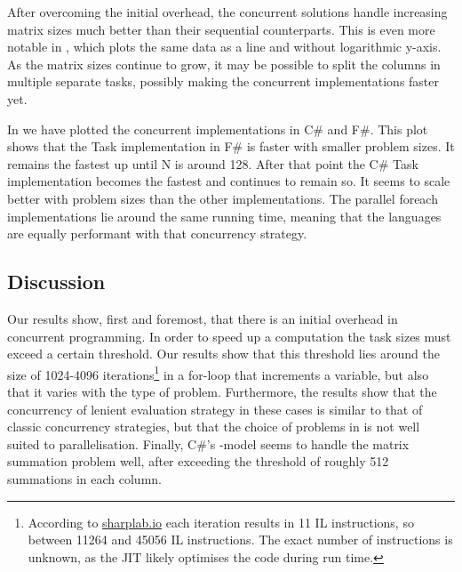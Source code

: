 After overcoming the initial overhead, the concurrent solutions handle increasing matrix sizes much better than their sequential counterparts. This is even more notable in , which plots the same data as a line and without logarithmic y-axis. As the matrix sizes continue to grow, it may be possible to split the columns in multiple separate tasks, possibly making the concurrent implementations faster yet.


In  we have plotted the concurrent implementations in C\# and F\#. This plot shows that the Task implementation in F\# is faster with smaller problem sizes. It remains the fastest up until N is around 128. After that point the C\# Task implementation becomes the fastest and continues to remain so. It seems to scale better with problem sizes than the other implementations. The parallel foreach implementations lie around the same running time, meaning that the languages are equally performant with that concurrency strategy.

\subsection{Discussion}\label{sec:crit-work-dis}
Our results show, first and foremost, that there is an initial overhead in concurrent programming. In order to speed up a computation the task sizes must exceed a certain threshold. Our results show that this threshold lies around the size of 1024-4096 iterations\footnote{According to \url{sharplab.io} each iteration results in 11 \gls{IL} instructions, so between 11264 and 45056 \gls{IL} instructions. The exact number of instructions is unknown, as the \gls{JIT} likely optimises the code during run time.} in a for-loop that increments a variable, but also that it varies with the type of problem. Furthermore, the results show that the concurrency of lenient evaluation strategy in these cases is similar to that of classic concurrency strategies, but that the choice of problems in \cite{DBLP:journals/cl/Tremblay-parallel} is not well suited to parallelisation. Finally, C\#'s -model seems to handle the matrix summation problem well, after exceeding the threshold of roughly 512 summations in each column.

